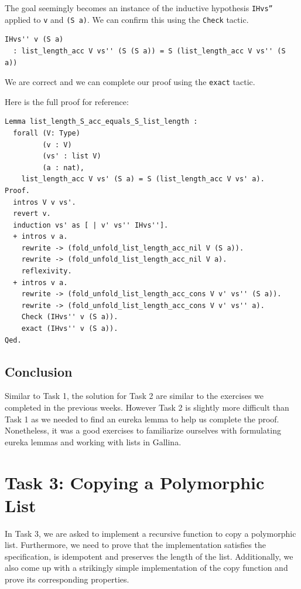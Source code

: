 \documentclass{article}
\begin{document}
The goal seemingly becomes an instance of the inductive hypothesis \texttt{IHvs''} applied to \texttt{v} and \texttt{(S a)}. We can confirm this using the \texttt{Check} tactic.

\begin{lstlisting}
IHvs'' v (S a)
  : list_length_acc V vs'' (S (S a)) = S (list_length_acc V vs'' (S a))
\end{lstlisting}

We are correct and we can complete our proof using the \texttt{exact} tactic.

Here is the full proof for reference:

\begin{lstlisting}
Lemma list_length_S_acc_equals_S_list_length : 
  forall (V: Type)
         (v : V)
         (vs' : list V)
         (a : nat),
    list_length_acc V vs' (S a) = S (list_length_acc V vs' a).
Proof.
  intros V v vs'.
  revert v.
  induction vs' as [ | v' vs'' IHvs''].
  + intros v a.
    rewrite -> (fold_unfold_list_length_acc_nil V (S a)).
    rewrite -> (fold_unfold_list_length_acc_nil V a).
    reflexivity.
  + intros v a.
    rewrite -> (fold_unfold_list_length_acc_cons V v' vs'' (S a)).
    rewrite -> (fold_unfold_list_length_acc_cons V v' vs'' a).
    Check (IHvs'' v (S a)).
    exact (IHvs'' v (S a)).
Qed.

\end{lstlisting}

\subsection{Conclusion}

Similar to Task 1, the solution for Task 2 are similar to the exercises we completed in the previous weeks. However Task 2 is slightly more difficult than Task 1 as we needed to find an eureka lemma to help us complete the proof. Nonetheless, it was a good exercises to familiarize ourselves with formulating eureka lemmas and working with lists in Gallina.

\newpage

\section{Task 3: Copying a Polymorphic List}

In Task 3, we are asked to implement a recursive function to copy a polymorphic list. Furthermore, we need to prove that the implementation satisfies the specification, is idempotent and preserves the length of the list. Additionally, we also come up with a strikingly simple implementation of the copy function and prove its corresponding properties.
\end{document}
